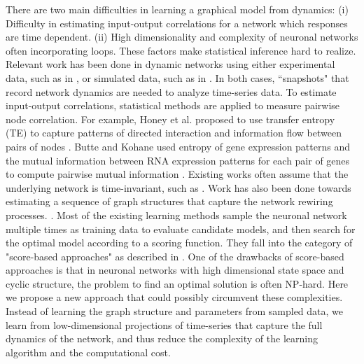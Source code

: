 \documentclass[letterpaper,11pt]{article}
\begin{document}
There are two main difficulties in learning a graphical model from dynamics: (i) Difficulty in estimating input-output correlations for a network which responses are time dependent. (ii) High dimensionality and complexity of neuronal networks often incorporating loops. These factors make statistical inference hard to realize. Relevant work has been done in dynamic networks using either experimental data, such as in \cite{Bayesian,varying1, varying2}, or simulated data, such as in \cite{TE}. In both cases, ``snapshots" that record  network dynamics are needed to analyze time-series data. To estimate input-output correlations, statistical methods are applied to measure pairwise node correlation. For example, Honey et al. proposed to use transfer entropy (TE) to capture patterns of directed interaction and information flow between pairs of nodes \cite{TE}. Butte and Kohane used entropy of gene expression patterns and the mutual information between RNA expression patterns for each pair of genes to compute pairwise mutual information \cite{Entropy}. Existing works often assume that the underlying network is time-invariant, such as \cite{Bayesian,Basso}. Work has also been done towards estimating a sequence of graph structures that capture the network rewiring processes. \cite{varying1,varying2}. Most of the existing learning methods sample the neuronal network multiple times as training data to evaluate candidate models, and then search for the optimal model according to a scoring function. They fall into the category of "score-based approaches" as described in \cite{nutshell}. One of the drawbacks of score-based approaches is that in neuronal networks with high dimensional state space and cyclic structure, the problem to find an optimal solution is often NP-hard. Here we propose a new approach that could possibly circumvent these complexities. Instead of learning the graph structure and parameters from sampled data, we learn from low-dimensional projections of time-series that capture the full dynamics of the network, and thus reduce the complexity of the learning algorithm and the computational cost.
\end{document}
